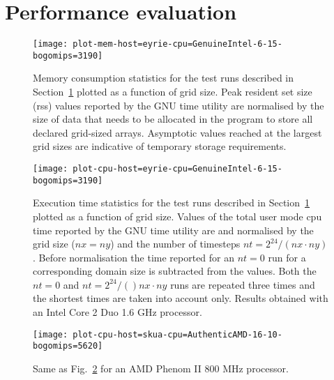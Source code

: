 \documentclass[final,5p,times,twocolumn]{elsarticle}
\begin{document}
  \section{Performance evaluation}\label{sec:perf}

  \begin{figure}
    \center
    \texttt{[image: plot-mem-host=eyrie-cpu=GenuineIntel-6-15-bogomips=3190]}
    \caption{\label{fig:mem}
      Memory consumption statistics for the test runs described in Section~\ref{sec:perf}
        plotted as a function of grid size.
      Peak resident set size (rss) values reported by the GNU time utility are normalised by the size of
        data that needs to be allocated in the program to store all declared grid-sized arrays.
      Asymptotic values reached at the largest grid sizes are indicative 
        of temporary storage requirements.
    }
  \end{figure}
  \begin{figure}
    \center
    \texttt{[image: plot-cpu-host=eyrie-cpu=GenuineIntel-6-15-bogomips=3190]}
    \caption{\label{fig:cpu-eyrie}
      Execution time statistics for the test runs described in Section~\ref{sec:perf}
        plotted as a function of grid size.
      Values of the total user mode cpu time reported by the GNU time utility are
        and normalised by the grid size ($nx=ny$) and the number of timesteps $nt=2^{24}/(nx \cdot ny)$.
      Before normalisation the time reported for an $nt=0$ run for a corresponding
        domain size is subtracted from the values.
      Both the $nt=0$ and $nt=2^{24}/()nx \cdot ny$ runs are repeated three times and
        the shortest times are taken into account only.
      Results obtained with an Intel\textsuperscript{\textregistered} 
        Core\textsuperscript{\texttrademark} 2 Duo 1.6 GHz processor.
    }
  \end{figure}
  \begin{figure}
    \center
    \texttt{[image: plot-cpu-host=skua-cpu=AuthenticAMD-16-10-bogomips=5620]}
    \caption{\label{fig:cpu-skua}
      Same as Fig.~\ref{fig:cpu-eyrie} for an AMD Phenom\textsuperscript{\texttrademark} II 800 MHz processor.
    }
  \end{figure}
\end{document}
